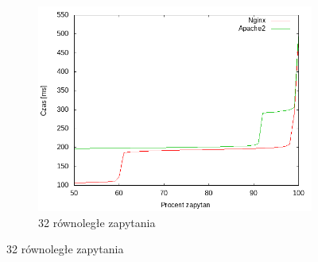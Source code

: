 \begin{figure}
\begin{subfigure}[h]{0.3\textwidth}
		\includegraphics[width=\textwidth]{testy/wybor_fib_15_32.png}
		\caption{32 równoległe zapytania}
	\end{subfigure}


\end{figure}
